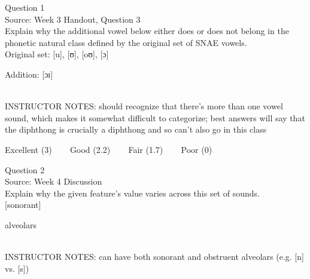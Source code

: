\documentclass[12pt]{article}
\begin{document}
\begin{center}
\textbf{{\color{violet}{\HUGE 20201014 Wednesday\\}}}

\textbf{{\color{violet}{\HUGE ALL EXAMS (with notes)\\}}}

\end{center}
\newpage

\begin{center}
\textbf{{\color{blue}{\HUGE START OF EXAM\\}}}

\textbf{{\color{blue}{\HUGE Student ID: 44715\\}}}

\textbf{{\color{blue}{\HUGE 4:00\\}}}

\end{center}
\newpage

{\large Question 1}\\

Source: Week 3 Handout, Question 3\\

Explain why the additional vowel below either does or does not belong in the phonetic natural class defined by the original set of SNAE vowels.\\

Original set: {[u]}, {[ʊ]}, {[oʊ]}, {[ɔ]}

Addition: {[ɔɪ]}


~\\
INSTRUCTOR NOTES: should recognize that there's more than one vowel sound, which makes it somewhat difficult to categorize; best answers will say that the diphthong is crucially a diphthong and so can't also go in this class


\vfill
Excellent (3) ~~~ Good (2.2) ~~~ Fair (1.7) ~~~ Poor (0)
\newpage

{\large Question 2}\\

Source: Week 4 Discussion\\

Explain why the given feature's value varies across this set of sounds.\\

{[sonorant]}

alveolars


~\\
INSTRUCTOR NOTES: can have both sonorant and obstruent alveolars (e.g. [n] vs. [s])
\end{document}
